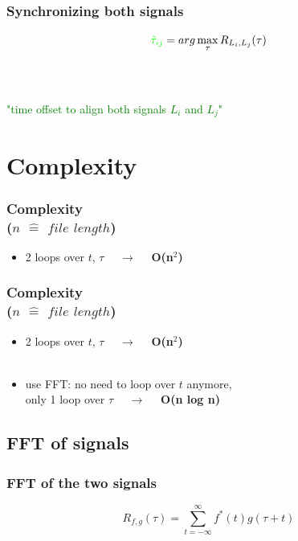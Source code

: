 \documentclass{beamer}
\begin{document}
\begin{frame}
\frametitle{Synchronizing both signals}
\begin{displaymath}
\textcolor{green}{
\hat{\tau}_{ij} } = arg \max_{\tau} R_{L_{i}, L_{j}} (\tau)
\end{displaymath}
\ \\
\ \\
\begin{center}
\textcolor{green}{
"time offset to align both signals $L_i$ and $L_j$"
}
\end{center}
\end{frame}







\section{Complexity}
\begin{frame}
\frametitle{Complexity \ \\ ($n$ $\hat{=}$ $file$ $length$)}
\begin{itemize}
\item 2 loops over $t$, $\tau$ \ \ $\longrightarrow$ \ \ \textbf{O(n$^2$)}
\end{itemize}
\end{frame}

\begin{frame}
\frametitle{Complexity \ \\ ($n$ $\hat{=}$ $file$ $length$)}
\begin{itemize}
\item 2 loops over $t$, $\tau$ \ \ $\longrightarrow$ \ \ \textbf{O(n$^2$)}
\ \\
\ \\
\item use FFT: no need to loop over $t$ anymore,\\ only 1 loop over $\tau$ \ \ $\longrightarrow$ \ \ \textbf{O(n log n)}
\end{itemize}
\end{frame}



\subsection{FFT of signals}

\begin{frame}
\frametitle{FFT of the two signals}
\begin{displaymath}
R_{f,g}(\tau)= \sum_{ t = -\infty}^{\infty}  f^*(t) g(\tau +t) %
\end{displaymath}
\end{frame}
\end{document}

